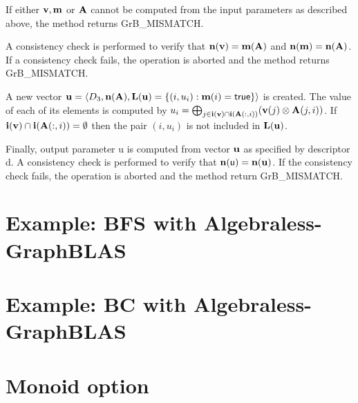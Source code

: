 \documentclass[11pt]{extarticle}
\begin{document}
{If either ${\bf v}, {\bf m}$ or ${\bf A}$ cannot be computed
from the input parameters as described above, the method returns {\sf
GrB\_MISMATCH}.

A consistency check is performed to verify that $\bold{n}({\bf v})
= \bold{m}({\bf A})$ and $\bold{n}({\bf m}) =
\bold{n}({\bf A})$. If a consistency check fails, the operation is
aborted and the method returns {\sf GrB\_MISMATCH}.

A new vector ${\bf u} = \langle D_3, \bold{n}({\bf A}),
\bold{L}({\bf u}) = \{(i,u_i) : {\bf m}(i) = {\sf true} \} \rangle$
is created.  The value of each of its elements is computed by $u_i =
\bigoplus_{j \in {\bf i}({\bf v}) \cap {\bf i}({\bf A}(:,i))}
({\bf v}(j) \otimes {\bf A}(j,i))$.  If ${\bf i}({\bf v})
\cap {\bf i}({\bf A}(:,i)) = \emptyset$ then the pair $(i,u_i)$
is not included in $\bold{L}({\bf u})$.

Finally, output parameter {\sf u} is computed from vector ${\bf u}$
as specified by descriptor {\sf d}.  A consistency check is performed
to verify that $\bold{n}({\sf u}) = \bold{n}({\bf u})$. If the
consistency check fails, the operation is aborted and the method return
{\sf GrB\_MISMATCH}.


\pagebreak
\nolinenumbers
\section{Example: BFS with Algebraless-GraphBLAS}
{\scriptsize

}

\pagebreak
\nolinenumbers
\section{Example: BC with Algebraless-GraphBLAS}
{\scriptsize

}

\pagebreak
\linenumbers
\section{Monoid option}

}
\end{document}
